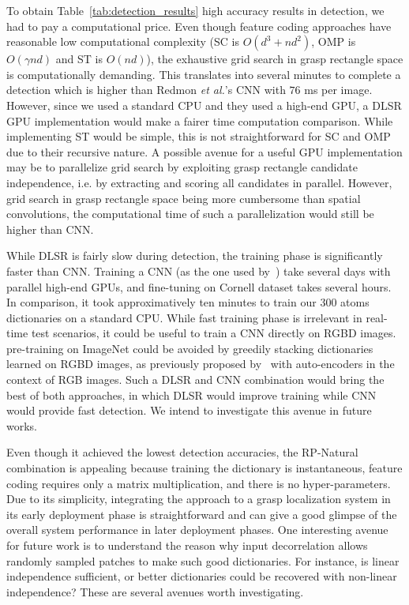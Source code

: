 \documentclass[svgnames]{scrartcl}
\begin{document}
To obtain Table~\ref{tab:detection_results} high accuracy results in detection, we had to pay a computational price. Even though feature coding approaches have reasonable low computational complexity (SC is $O(d^3+nd^2)$, OMP is $ O(\gamma  n  d) $ and ST is $O(n  d)$), the exhaustive grid search in grasp rectangle space is computationally demanding. This translates into several minutes to complete a detection which is higher than Redmon \textit{et al.}'s CNN with $76$ ms per image. However, since we used a standard CPU and they used a high-end GPU, a DLSR GPU implementation would make a fairer time computation comparison. While implementing ST would be simple, this is not straightforward for SC and OMP due to their recursive nature. A possible avenue for a useful GPU implementation may be to parallelize grid search by exploiting grasp rectangle candidate independence, i.e. by extracting and scoring all candidates in parallel. However, grid search in grasp rectangle space being more cumbersome than spatial convolutions, the computational time of such a parallelization would still be higher than CNN.


While DLSR is fairly slow during detection, the training phase is significantly faster than CNN. Training a CNN (as the one used by~\citet{redmonRealtimeCnnGrasp}) take several days with parallel high-end GPUs, and fine-tuning on Cornell dataset takes several hours. In comparison, it took approximatively ten minutes to train our $300$ atoms dictionaries on a standard CPU. While fast training phase is irrelevant in real-time test scenarios, it could be useful to train a CNN directly on RGBD images. \citet{redmonRealtimeCnnGrasp} pre-training on ImageNet could be avoided by greedily stacking dictionaries learned on RGBD images, as previously proposed by~\citet{bengio2007greedy} with auto-encoders in the context of RGB images. Such a DLSR and CNN combination would bring the best of both approaches, in which DLSR would improve training while CNN would provide fast detection. We intend to investigate this avenue in future works.


Even though it achieved the lowest detection accuracies, the RP-Natural combination is appealing because training the dictionary is instantaneous, feature coding requires only a matrix multiplication, and there is no hyper-parameters. Due to its simplicity, integrating the approach to a grasp localization system in its early deployment phase is straightforward and can give a good glimpse of the overall system performance in later deployment phases. One interesting avenue for future work is to understand the reason why input decorrelation allows randomly sampled patches to make such good dictionaries. For instance, is linear independence sufficient, or better dictionaries could be recovered with non-linear independence? These are several avenues worth investigating.
\end{document}
